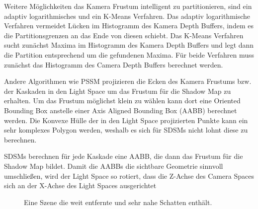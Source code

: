 \documentclass[runningheaders,a4paper]{llncs}
\begin{document}
Weitere Möglichkeiten das Kamera Frustum intelligent zu partitionieren, sind ein adaptiv logarithmisches und ein K-Means Verfahren.
Das adaptiv logarithmische Verfahren vermeidet Lücken im Histogramm des Kamera Depth Buffers, indem es die Partitionsgrenzen an das Ende von diesen schiebt.
Das K-Means Verfahren sucht zunächst Maxima im Histogramm des Kamera Depth Buffers und legt dann die Partition entsprechend um die gefundenen Maxima.
Für beide Verfahren muss zunächst das Histogramm des Camera Depth Buffers berechnet werden.


Andere Algorithmen wie PSSM \cite{pssm} projizieren die Ecken des Kamera Frustums bzw. der Kaskaden in den Light Space um das Frustum für die Shadow Map zu erhalten.
Um das Frustum möglichst klein zu wählen kann dort eine Oriented Bounding Box anstelle einer Axis Aligned Bounding Box (AABB) berechnet werden.
Die Konvexe Hülle der in den Light Space projizierten Punkte kann ein sehr komplexes Polygon werden, weshalb es sich für SDSMs nicht lohnt diese zu berechnen.

SDSMs berechnen für jede Kaskade eine AABB, die dann das Frustum für die Shadow Map bildet.
Damit die AABBs die sichtbare Geometrie sinnvoll umschließen, wird der Light Space so rotiert, dass die Z-Achse des Camera Spaces sich an der X-Achse des Light Spaces ausgerichtet


\begin{figure}
	\centering
	\caption{Eine Szene die weit entfernte und sehr nahe Schatten enthält.}
\end{figure}
\end{document}
